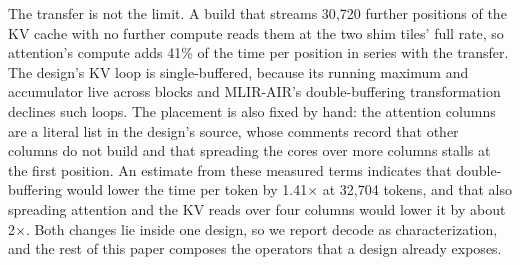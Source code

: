 The transfer is not the limit.
A build that streams 30{,}720 further positions of the KV cache with no further compute reads them at the two shim tiles' full rate, so attention's compute adds 41\% of the time per position in series with the transfer.
The design's KV loop is single-buffered, because its running maximum and accumulator live across blocks and MLIR-AIR's double-buffering transformation declines such loops.
The placement is also fixed by hand: the attention columns are a literal list in the design's source, whose comments record that other columns do not build and that spreading the cores over more columns stalls at the first position.
An estimate from these measured terms indicates that double-buffering would lower the time per token by 1.41$\times$ at 32{,}704 tokens, and that also spreading attention and the KV reads over four columns would lower it by about 2$\times$.
Both changes lie inside one design, so we report decode as characterization, and the rest of this paper composes the operators that a design already exposes.
